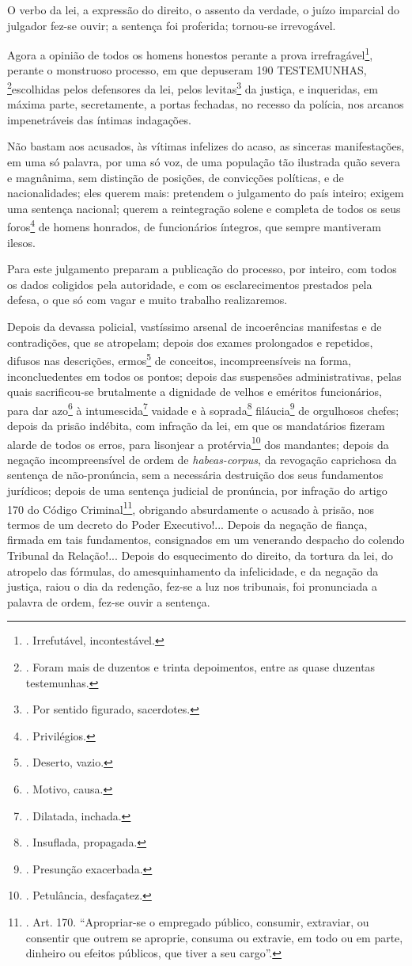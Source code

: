 O verbo da lei, a expressão do direito, o assento da verdade, o juízo
imparcial do julgador fez-se ouvir; a sentença foi proferida; tornou-se
irrevogável.

Agora a opinião de todos os homens honestos perante a prova
irrefragável\footnote{. Irrefutável, incontestável.}, perante o
monstruoso processo, em que depuseram 190 TESTEMUNHAS, \footnote{. Foram
  mais de duzentos e trinta depoimentos, entre as quase duzentas
  testemunhas.}escolhidas pelos defensores da lei, pelos
levitas\footnote{. Por sentido figurado, sacerdotes.} da justiça, e
inqueridas, em máxima parte, secretamente, a portas fechadas, no recesso
da polícia, nos arcanos impenetráveis das íntimas indagações.

Não bastam aos acusados, às vítimas infelizes do acaso, as sinceras
manifestações, em uma só palavra, por uma só voz, de uma população tão
ilustrada quão severa e magnânima, sem distinção de posições, de
convicções políticas, e de nacionalidades; eles querem mais: pretendem o
julgamento do país inteiro; exigem uma sentença nacional; querem a
reintegração solene e completa de todos os seus foros\footnote{.
  Privilégios.} de homens honrados, de funcionários íntegros, que sempre
mantiveram ilesos.

Para este julgamento preparam a publicação do processo, por inteiro, com
todos os dados coligidos pela autoridade, e com os esclarecimentos
prestados pela defesa, o que só com vagar e muito trabalho realizaremos.

Depois da devassa policial, vastíssimo arsenal de incoerências
manifestas e de contradições, que se atropelam; depois dos exames
prolongados e repetidos, difusos nas descrições, ermos\footnote{.
  Deserto, vazio.} de conceitos, incompreensíveis na forma,
inconcluedentes em todos os pontos; depois das suspensões
administrativas, pelas quais sacrificou-se brutalmente a dignidade de
velhos e eméritos funcionários, para dar azo\footnote{. Motivo, causa.}
à intumescida\footnote{. Dilatada, inchada.} vaidade e à
soprada\footnote{. Insuflada, propagada.} filáucia\footnote{. Presunção
  exacerbada.} de orgulhosos chefes; depois da prisão indébita, com
infração da lei, em que os mandatários fizeram alarde de todos os erros,
para lisonjear a protérvia\footnote{. Petulância, desfaçatez.} dos
mandantes; depois da negação incompreensível de ordem de
\emph{habeas-corpus}, da revogação caprichosa da sentença de
não-pronúncia, sem a necessária destruição dos seus fundamentos
jurídicos; depois de uma sentença judicial de pronúncia, por infração do
artigo 170 do Código Criminal\footnote{. Art. 170. ``Apropriar-se o
  empregado público, consumir, extraviar, ou consentir que outrem se
  aproprie, consuma ou extravie, em todo ou em parte, dinheiro ou
  efeitos públicos, que tiver a seu cargo''.}, obrigando absurdamente o
acusado à prisão, nos termos de um decreto do Poder Executivo!... Depois
da negação de fiança, firmada em tais fundamentos, consignados em um
venerando despacho do colendo Tribunal da Relação!... Depois do
esquecimento do direito, da tortura da lei, do atropelo das fórmulas, do
amesquinhamento da infelicidade, e da negação da justiça, raiou o dia da
redenção, fez-se a luz nos tribunais, foi pronunciada a palavra de
ordem, fez-se ouvir a sentença.

